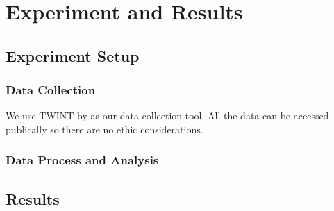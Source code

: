 \section{Experiment and Results}

\subsection{Experiment Setup}

\subsubsection{Data Collection}

We use TWINT by \cite{twint} as our data collection tool.
All the data can be accessed publically so there are no ethic considerations.

\subsubsection{Data Process and Analysis}

\subsection{Results}
